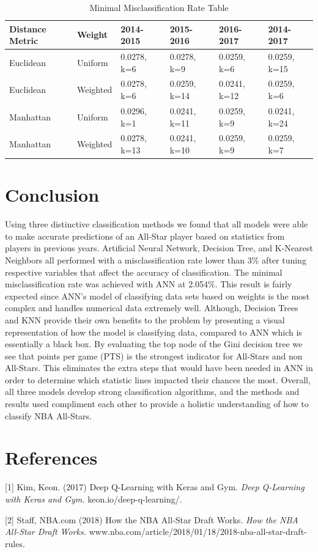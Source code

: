 \documentclass{article}
\begin{document}
\begin{table}
  \caption{Minimal Misclassification Rate Table}
  \label{Min-MR-table}
  \centering
  \begin{tabular}{llllll}
    \toprule
    Distance Metric & Weight & 2014-2015 & 2015-2016 & 2016-2017 & 2014-2017\\
    \midrule
    Euclidean & Uniform     & 0.0278, k=6   & 0.0278, k=9 & 0.0259, k=6 & 0.0259, k=15\\
    Euclidean & Weighted &  0.0278, k=6   & 0.0259, k=14 & 0.0241, k=12 & 0.0259, k=6\\
    Manhattan & Uniform     & 0.0296, k=1   & 0.0241, k=11 & 0.0259, k=9 & 0.0241, k=24\\
    Manhattan & Weighted &  0.0278, k=13   & 0.0241, k=10 & 0.0259, k=9 & 0.0259, k=7\\
    \bottomrule
  \end{tabular}
\end{table}


\section{Conclusion}
Using three distinctive classification methods we found that all models were able to make accurate predictions of an All-Star player based on statistics from players in previous years. Artificial Neural Network, Decision Tree, and K-Nearest Neighbors all performed with a misclassification rate lower than 3\% after tuning respective variables that affect the accuracy of classification. The minimal misclassification rate was achieved with ANN at 2.054\%. This result is fairly expected since ANN’s model of classifying data sets based on weights is the most complex and handles numerical data extremely well. Although, Decision Trees and KNN provide their own benefits to the problem by presenting a visual representation of how the model is classifying data, compared to ANN which is essentially a black box. By evaluating the top node of the Gini decision tree we see that points per game (PTS) is the strongest indicator for All-Stars and non All-Stars. This eliminates the extra steps that would have been needed in ANN in order to determine which statistic lines impacted their chances the most. Overall, all three models develop strong classification algorithms, and the methods and results used compliment each other to provide a holistic understanding of how to classify NBA All-Stars.

\section*{References}
\small
[1] Kim, Keon. (2017) Deep Q-Learning with Keras and Gym. {\it Deep Q-Learning with Keras and Gym.} keon.io/deep-q-learning/.

[2] Staff, NBA.com (2018) How the NBA All-Star Draft Works. {\it How the NBA All-Star Draft Works. } www.nba.com/article/2018/01/18/2018-nba-all-star-draft-rules.
\end{document}
